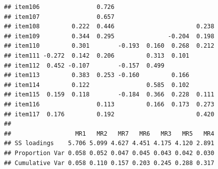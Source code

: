 \documentclass[
  english,
  man]{apa6}
\begin{document}
\begin{verbatim}
## item106                0.726                            
## item107                0.657                            
## item108         0.222  0.446                       0.238
## item109         0.344  0.295               -0.204  0.198
## item110         0.301        -0.193  0.160  0.268  0.212
## item111 -0.272  0.142  0.206         0.313  0.101       
## item112  0.452 -0.107        -0.157  0.499              
## item113         0.383  0.253 -0.160         0.166       
## item114         0.122                0.585  0.102       
## item115  0.159  0.118        -0.184  0.366  0.228  0.111
## item116                0.113         0.166  0.173  0.273
## item117  0.176         0.192                       0.420
## 
##                  MR1   MR2   MR7   MR6   MR3   MR5   MR4
## SS loadings    5.706 5.099 4.627 4.451 4.175 4.120 2.891
## Proportion Var 0.058 0.052 0.047 0.045 0.043 0.042 0.030
## Cumulative Var 0.058 0.110 0.157 0.203 0.245 0.288 0.317
\end{verbatim}
\end{document}
